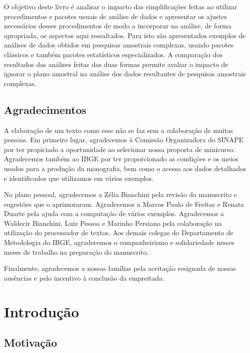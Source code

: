 \documentclass[
  12pt,
  brazilian,
]{book}
\theoremstyle{definition}
\theoremstyle{definition}
\theoremstyle{definition}
\theoremstyle{definition}
\theoremstyle{remark}
\begin{document}
O objetivo deste livro é analisar o impacto das simplificações feitas ao utilizar procedimentos e pacotes usuais de análise de dados e apresentar os ajustes necessários desses procedimentos de modo a incorporar na análise, de forma apropriada, os aspectos aqui ressaltados. Para isto são apresentados exemplos de análises de dados obtidos em pesquisas amostrais complexas, usando pacotes clássicos e também pacotes estatísticos especializados. A comparação
dos resultados das análises feitas das duas formas permite avaliar o impacto de ignorar o plano amostral na análise dos dados resultantes de pesquisas amostrais complexas.

\hypertarget{agradecimentos}{%
\section*{Agradecimentos}\label{agradecimentos}}

A elaboração de um texto como esse não se faz sem a colaboração de muitas pessoas. Em primeiro lugar, agradecemos à Comissão Organizadora do SINAPE por ter propiciado a oportunidade ao selecionar nossa proposta de minicurso. Agradecemos também ao IBGE por ter proporcionado as condições e os meios usados para a produção da monografia, bem como o acesso aos dados detalhados e identificados que utilizamos em vários exemplos.

No plano pessoal, agradecemos a Zélia Bianchini pela revisão do manuscrito e sugestões que o aprimoraram. Agradecemos a Marcos Paulo de Freitas e Renata Duarte pela ajuda com a computação de vários exemplos. Agradecemos a Waldecir Bianchini, Luiz Pessoa e Marinho Persiano pela colaboração na utilização do processador de textos. Aos demais colegas do Departamento de Metodologia do IBGE, agradecemos o companheirismo e solidariedade nesses meses de trabalho na preparação do manuscrito.

Finalmente, agradecemos a nossas famílias pela aceitação resignada de nossas ausências e pelo incentivo à conclusão da empreitada.

\hypertarget{introduc}{%
\chapter{Introdução}\label{introduc}}

\hypertarget{motivauxe7uxe3o}{%
\section{Motivação}\label{motivauxe7uxe3o}}
\end{document}
